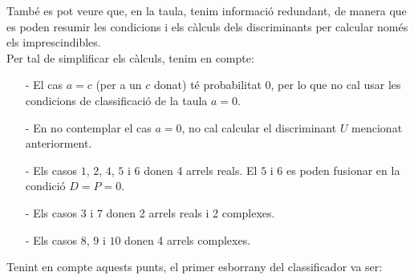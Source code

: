 \documentclass[a4paper, 11pt]{article}
\begin{document}
També es pot veure que, en la taula, tenim informació redundant, de manera que es poden resumir les condicions i els càlculs dels discriminants per calcular només els imprescindibles.\\
\newpage
\hspace{-1.5em}Per tal de simplificar els càlculs, tenim en compte: \label{1}
\begin{itemize}
    \item [-] El cas $a=c$ (per a un $c$ donat) té probabilitat $0$, per lo que no cal usar les condicions de classificació de la taula $a=0$.
    \item [-] En no contemplar el cas $a=0$, no cal calcular el discriminant $U$ mencionat anteriorment.
    \item [-] Els casos $1$, $2$, $4$, $5$ i $6$ donen 4 arrels reals. El $5$ i $6$ es poden fusionar en la condició $D=P=0$.
    \item [-] Els casos $3$ i $7$ donen 2 arrels reals i 2 complexes.
    \item [-] Els casos $8$, $9$ i $10$ donen 4 arrels complexes.
\end{itemize}
Tenint en compte aquests punts, el primer esborrany del classificador va ser:
\end{document}
